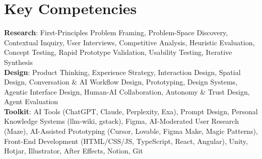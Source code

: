 \section{Key Competencies}
    \begin{itemize}[leftmargin=0.15in, label={}]
    \small{\item{
        \textbf{Research}{: First-Principles Problem Framing, Problem-Space Discovery, Contextual Inquiry, User Interviews, Competitive Analysis, Heuristic Evaluation, Concept Testing, Rapid Prototype Validation, Usability Testing, Iterative Synthesis} \\
        \textbf{Design}{: Product Thinking, Experience Strategy, Interaction Design, Spatial Design, Conversation \& AI Workflow Design, Prototyping, Design Systems, Agentic Interface Design, Human-AI Collaboration, Autonomy \& Trust Design, Agent Evaluation} \\
        \textbf{Toolkit}{: AI Tools (ChatGPT, Claude, Perplexity, Exa), Prompt Design, Personal Knowledge Systems (llm-wiki, gstack), Figma, AI-Moderated User Research (Maze), AI-Assisted Prototyping (Cursor, Lovable, Figma Make, Magic Patterns), Front-End Development (HTML/CSS/JS, TypeScript, React, Angular), Unity, Hotjar, Illustrator, After Effects, Notion, Git}
    }}
    \end{itemize}
